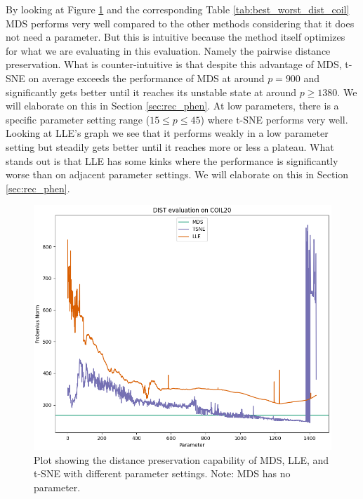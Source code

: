 By looking at Figure \ref{fig:dist_all_coil20_plot} and the corresponding Table \ref{tab:best_worst_dist_coil} MDS performs very well compared to the other methods considering that it does not need a parameter. But this is intuitive because the method itself optimizes for what we are evaluating in this evaluation. Namely the pairwise distance preservation. What is counter-intuitive is that despite this advantage of MDS, t-SNE on average exceeds the performance of MDS at around $p=900$ and significantly gets better until it reaches its unstable state at around $p\geq 1380$. We will elaborate on this in Section \ref{sec:rec_phen}. At low parameters, there is a specific parameter setting range ($15\leq p\leq 45$) where t-SNE performs very well. Looking at LLE's graph we see that it performs weakly in a low parameter setting but steadily gets better until it reaches more or less a plateau. What stands out is that LLE has some kinks where the performance is significantly worse than on adjacent parameter settings. We will elaborate on this in Section \ref{sec:rec_phen}. 

\begin{figure}[!]
	\centering
	\includegraphics[width=1\columnwidth]{images/dist_all_coil20_plot.png}
    \caption[COIL-20 Distance Preservation]{Plot showing the distance preservation capability of MDS, LLE, and t-SNE with different parameter settings. Note: MDS has no parameter.}
    \label{fig:dist_all_coil20_plot}
\end{figure}

